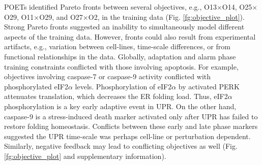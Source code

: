 \documentclass[fleqn,10pt]{wlscirep}
\begin{document}
POETs identified Pareto fronts between several objectives, e.g., O13$\times$O14, O25$\times$O29, O11$\times$O29, and O27$\times$O2, in the training data  (Fig. \ref{fg:objective_plot}).
Strong Pareto fronts suggested an inability to simultaneously model different aspects of the training data.
However, fronts could also result from experimental artifacts, e.g., variation between cell-lines, time-scale differences, or from functional relationships in the data.
Globally, adaptation and alarm phase training constraints conflicted with those involving apoptosis.
For example, objectives involving caspase-7 or caspase-9 activity conflicted with phosphorylated eIF2$\alpha$ levels.
Phosphorylation of eIF2$\alpha$ by activated PERK attenuates translation, which decreases the ER folding load.
Thus, eIF2$\alpha$ phosphorylation is a key early adaptive event in UPR. On the other hand, caspase-9 is a stress-induced death marker activated only after UPR has failed to restore folding homeostasis.
Conflicts between these early and late phase markers suggested the UPR time-scale was perhaps cell-line or perturbation dependent.
Similarly, negative feedback may lead to conflicting objectives as well (Fig. \ref{fg:objective_plot} and supplementary information).

\end{document}
